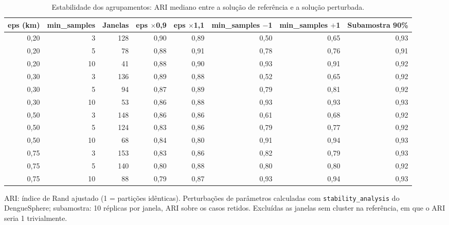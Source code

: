 \begin{table}[htbp]
\centering
\small
\caption{Estabilidade dos agrupamentos: ARI mediano entre a solução de referência e a solução perturbada.}
\label{tab:estabilidade}
\begin{adjustbox}{max width=\linewidth}
\begin{tabular}{rrrrrrrr}
\toprule
eps (km) & min\_samples & Janelas & eps $\times$0,9 & eps $\times$1,1 & min\_samples $-$1 & min\_samples $+$1 & Subamostra 90\% \\
\midrule
0,20 & 3 & 128 & 0,90 & 0,89 & 0,50 & 0,65 & 0,93 \\
0,20 & 5 & 78 & 0,88 & 0,91 & 0,78 & 0,76 & 0,91 \\
0,20 & 10 & 41 & 0,88 & 0,90 & 0,93 & 0,91 & 0,92 \\
0,30 & 3 & 136 & 0,89 & 0,88 & 0,52 & 0,65 & 0,92 \\
0,30 & 5 & 94 & 0,87 & 0,89 & 0,79 & 0,81 & 0,92 \\
0,30 & 10 & 53 & 0,86 & 0,88 & 0,93 & 0,93 & 0,93 \\
0,50 & 3 & 148 & 0,86 & 0,86 & 0,61 & 0,68 & 0,92 \\
0,50 & 5 & 124 & 0,83 & 0,86 & 0,79 & 0,77 & 0,92 \\
0,50 & 10 & 68 & 0,84 & 0,80 & 0,91 & 0,94 & 0,93 \\
0,75 & 3 & 153 & 0,83 & 0,86 & 0,82 & 0,79 & 0,93 \\
0,75 & 5 & 140 & 0,80 & 0,88 & 0,80 & 0,80 & 0,92 \\
0,75 & 10 & 88 & 0,79 & 0,87 & 0,93 & 0,94 & 0,93 \\
\bottomrule
\end{tabular}
\end{adjustbox}
\par\smallskip\begin{minipage}{0.95\linewidth}\footnotesize ARI: índice de Rand ajustado (1 = partições idênticas). Perturbações de parâmetros calculadas com \texttt{stability\_analysis} do DengueSphere; subamostra: 10 réplicas por janela, ARI sobre os casos retidos. Excluídas as janelas sem cluster na referência, em que o ARI seria 1 trivialmente.\end{minipage}
\end{table}
